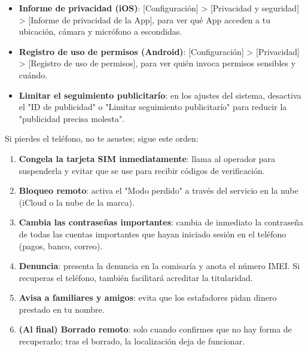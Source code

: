 
\begin{itemize}
  \item \textbf{Informe de privacidad (iOS)}: [Configuración] > [Privacidad y seguridad] > [Informe de privacidad de la App], para ver qué App acceden a tu ubicación, cámara y micrófono a escondidas.
  \item \textbf{Registro de uso de permisos (Android)}: [Configuración] > [Privacidad] > [Registro de uso de permisos], para ver quién invoca permisos sensibles y cuándo.
  \item \textbf{Limitar el seguimiento publicitarío}: en los ajustes del sistema, desactiva el "ID de publicidad" o "Limitar seguimiento publicitarío" para reducir la "publicidad precisa molesta".
\end{itemize}


Si pierdes el teléfono, no te asustes; sigue este orden:

\begin{enumerate}
  \item \textbf{Congela la tarjeta SIM inmediatamente}: llama al operador para suspenderla y evitar que se use para recibir códigos de verificación.
  \item \textbf{Bloqueo remoto}: activa el "Modo perdido" a través del servicio en la nube (iCloud o la nube de la marca).
  \item \textbf{Cambia las contraseñas importantes}: cambia de inmediato la contraseña de todas las cuentas importantes que hayan iniciado sesión en el teléfono (pagos, banco, correo).
  \item \textbf{Denuncia}: presenta la denuncia en la comisaría y anota el número IMEI. Si recuperas el teléfono, también facilitará acreditar la titularidad.
  \item \textbf{Avisa a familiares y amigos}: evita que los estafadores pidan dinero prestado en tu nombre.
  \item \textbf{(Al final) Borrado remoto}: solo cuando confirmes que no hay forma de recuperarlo; tras el borrado, la localización deja de funcionar.
\end{enumerate}


